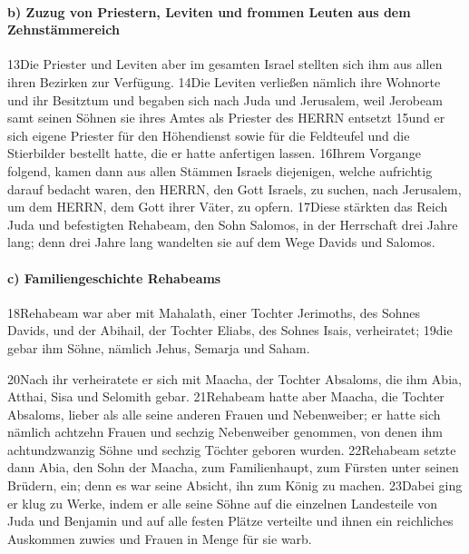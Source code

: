 \hypertarget{b-zuzug-von-priestern-leviten-und-frommen-leuten-aus-dem-zehnstuxe4mmereich}{%
\paragraph{b) Zuzug von Priestern, Leviten und frommen Leuten aus dem
Zehnstämmereich}\label{b-zuzug-von-priestern-leviten-und-frommen-leuten-aus-dem-zehnstuxe4mmereich}}

13Die Priester und Leviten aber im gesamten Israel stellten sich ihm aus
allen ihren Bezirken zur Verfügung. 14Die Leviten verließen nämlich ihre
Wohnorte und ihr Besitztum und begaben sich nach Juda und Jerusalem,
weil Jerobeam samt seinen Söhnen sie ihres Amtes als Priester des HERRN
entsetzt 15und er sich eigene Priester für den Höhendienst sowie für die
Feldteufel und die Stierbilder bestellt hatte, die er hatte anfertigen
lassen. 16Ihrem Vorgange folgend, kamen dann aus allen Stämmen Israels
diejenigen, welche aufrichtig darauf bedacht waren, den HERRN, den Gott
Israels, zu suchen, nach Jerusalem, um dem HERRN, dem Gott ihrer Väter,
zu opfern. 17Diese stärkten das Reich Juda und befestigten Rehabeam, den
Sohn Salomos, in der Herrschaft drei Jahre lang; denn drei Jahre lang
wandelten sie auf dem Wege Davids und Salomos.

\hypertarget{c-familiengeschichte-rehabeams}{%
\paragraph{c) Familiengeschichte
Rehabeams}\label{c-familiengeschichte-rehabeams}}

18Rehabeam war aber mit Mahalath, einer Tochter Jerimoths, des Sohnes
Davids, und der Abihail, der Tochter Eliabs, des Sohnes Isais,
verheiratet; 19die gebar ihm Söhne, nämlich Jehus, Semarja und Saham.

20Nach ihr verheiratete er sich mit Maacha, der Tochter Absaloms, die
ihm Abia, Atthai, Sisa und Selomith gebar. 21Rehabeam hatte aber Maacha,
die Tochter Absaloms, lieber als alle seine anderen Frauen und
Nebenweiber; er hatte sich nämlich achtzehn Frauen und sechzig
Nebenweiber genommen, von denen ihm achtundzwanzig Söhne und sechzig
Töchter geboren wurden. 22Rehabeam setzte dann Abia, den Sohn der
Maacha, zum Familienhaupt, zum Fürsten unter seinen Brüdern, ein; denn
es war seine Absicht, ihn zum König zu machen. 23Dabei ging er klug zu
Werke, indem er alle seine Söhne auf die einzelnen Landesteile von Juda
und Benjamin und auf alle festen Plätze verteilte und ihnen ein
reichliches Auskommen zuwies und Frauen in Menge für sie warb.


